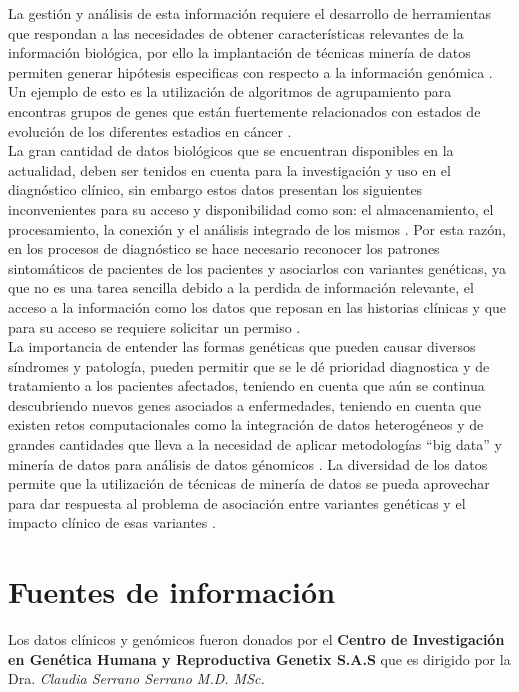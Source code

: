 La gestión y análisis de esta información requiere el desarrollo de herramientas que respondan a las necesidades de obtener características relevantes de la información biológica, por ello la implantación de técnicas minería de datos permiten generar hipótesis especificas con respecto a la información genómica \cite{Huttenhower2010}. Un ejemplo de esto es la utilización de algoritmos de agrupamiento para encontras grupos de genes que están fuertemente relacionados con estados de evolución de los diferentes estadios en cáncer \cite{Li2014}.\\

La gran cantidad de datos biológicos que se encuentran disponibles en la actualidad, deben ser tenidos en cuenta para la investigación y  uso en el diagnóstico clínico, sin embargo estos datos presentan los siguientes inconvenientes para su acceso y disponibilidad como son: el almacenamiento, el procesamiento, la conexión y el análisis integrado de los mismos \cite{Pabinger2014}. Por esta razón, en los procesos de diagnóstico se hace necesario reconocer los patrones  sintomáticos de pacientes de los pacientes y asociarlos con variantes genéticas, ya que no es una tarea sencilla debido a la perdida de información relevante, el acceso a la información como los datos que reposan en las historias clínicas y que para su acceso se requiere solicitar un permiso \cite{Pabinger2014}. \\

La importancia de entender las formas genéticas que pueden causar diversos síndromes y patología, pueden permitir que se le dé prioridad diagnostica y de tratamiento a los pacientes afectados, teniendo en cuenta que aún se continua descubriendo nuevos genes asociados a enfermedades, teniendo en cuenta que existen retos computacionales como la integración de datos heterogéneos y de grandes cantidades que lleva a la necesidad de aplicar metodologías “big data” y minería de datos para análisis de datos génomicos \cite{Maharjan2011,Hannah-Shmouni2015,Louie2007}. La diversidad de los datos permite que la utilización de técnicas de minería de datos se pueda aprovechar para dar respuesta al problema de asociación entre variantes genéticas y el impacto clínico de esas variantes \cite{Pabinger2014}.

\section*{Fuentes de  información}

Los datos clínicos y genómicos fueron donados por el \textbf{Centro de Investigación en Genética Humana y Reproductiva Genetix S.A.S} que es dirigido por la Dra. \textit{Claudia Serrano Serrano M.D. MSc.} 

